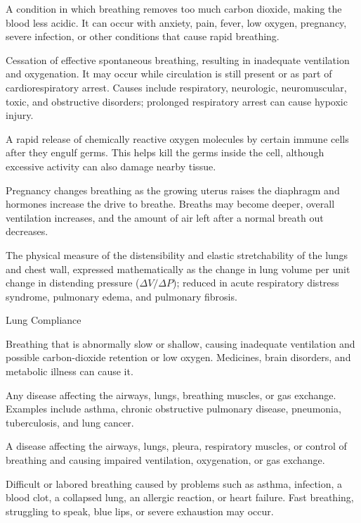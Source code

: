  A condition in which breathing removes too much carbon dioxide, making the blood less acidic. It can occur with anxiety, pain, fever, low oxygen, pregnancy, severe infection, or other conditions that cause rapid breathing.

 Cessation of effective spontaneous breathing, resulting in inadequate ventilation and oxygenation.
It may occur while circulation is still present or as part of cardiorespiratory arrest.
Causes include respiratory, neurologic, neuromuscular, toxic, and obstructive disorders;
prolonged respiratory arrest can cause hypoxic injury.

 A rapid release of chemically reactive oxygen molecules by certain immune cells after they engulf germs. This helps kill the germs inside the cell, although excessive activity can also damage nearby tissue.

 Pregnancy changes breathing as the growing uterus raises the diaphragm and hormones increase the drive to breathe. Breaths may become deeper, overall ventilation increases, and the amount of air left after a normal breath out decreases.

 The physical measure of the distensibility and elastic stretchability of the lungs and chest wall, expressed mathematically as the change in lung volume per unit change in distending pressure ($\Delta V / \Delta P$); reduced in acute respiratory distress syndrome, pulmonary edema, and pulmonary fibrosis.

\synonyms
Lung Compliance

 Breathing that is abnormally slow or shallow, causing inadequate ventilation and possible
carbon-dioxide retention or low oxygen. Medicines, brain disorders, and metabolic illness
can cause it.

 Any disease affecting the airways, lungs, breathing muscles, or gas exchange. Examples include asthma, chronic obstructive pulmonary disease, pneumonia, tuberculosis, and lung cancer.

 A disease affecting the airways, lungs, pleura, respiratory muscles, or control of breathing and causing impaired ventilation, oxygenation, or gas exchange.

 Difficult or labored breathing caused by problems such as asthma, infection, a blood clot, a collapsed lung, an allergic reaction, or heart failure. Fast breathing, struggling to speak, blue lips, or severe exhaustion may occur.

